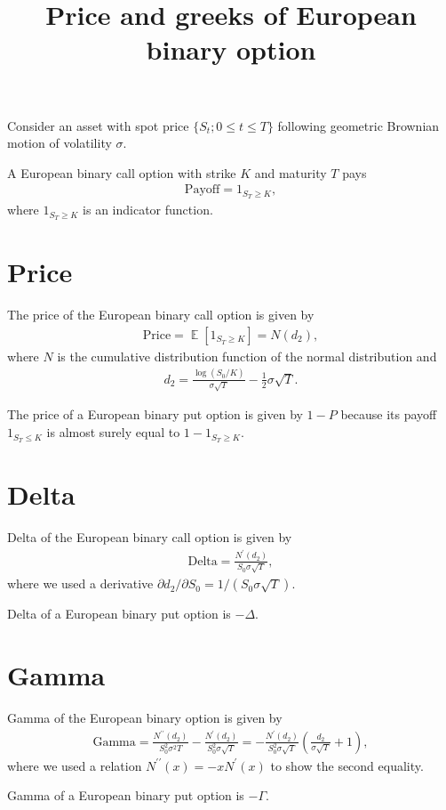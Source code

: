 \documentclass{article}
\newcommand\Ex{\mathop{\mathbb{E}}}
\newcommand\br[1]{\left(#1\right)}
\begin{document}
\title{Price and greeks of European binary option}
\date{}

\maketitle


Consider an asset with spot price $\{S_t; 0 \leq t \leq T\}$ following geometric Brownian motion of volatility $\sigma$.

A European binary call option with strike $K$ and maturity $T$ pays
\begin{align}
    \text{Payoff}
        = 1_{S_T \geq K} ,
\end{align}
where
$1_{S_T \geq K}$ is an indicator function.


\section*{Price}


The price of the European binary call option is given by
\begin{align}
    \text{Price}
        = \Ex[1_{S_T \geq K}] = N(d_2) ,
\end{align}
where
$N$ is the cumulative distribution function of the normal distribution and
\begin{align}
    d_2
        = \frac{\log (S_0 / K)}{\sigma \sqrt{T}} - \frac12 \sigma \sqrt{T} .
\end{align}

The price of a European binary put option is given by $1 - P$
because its payoff $1_{S_T \leq K}$ is almost surely equal to $1 - 1_{S_T \geq K}$.


\section*{Delta}


Delta of the European binary call option is given by
\begin{align}
    \text{Delta}
        = \frac{N^\prime(d_2)}{S_0 \sigma \sqrt{T}} ,
\end{align}
where
we used a derivative $\partial d_2 / \partial S_0 = 1 / (S_0 \sigma \sqrt{T})$.

Delta of a European binary put option is $- \Delta$.


\section*{Gamma}


Gamma of the European binary option is given by
\begin{align}
    \text{Gamma}
        = \frac{N^{\prime\prime}(d_2)}{S_0^2 \sigma^2 T}
            - \frac{N^{\prime}(d_2)}{S_0^2 \sigma \sqrt{T}}
        = - \frac{N^{\prime}(d_2)}{S_0^2 \sigma \sqrt{T}}
            \br{\frac{d_2}{\sigma \sqrt{T}} + 1} ,
    \label{eq:gamma}
\end{align}
where we used a relation $N^{\prime\prime}(x) = - x N^\prime(x)$ to show the second equality.

Gamma of a European binary put option is $- \Gamma$.
\end{document}
